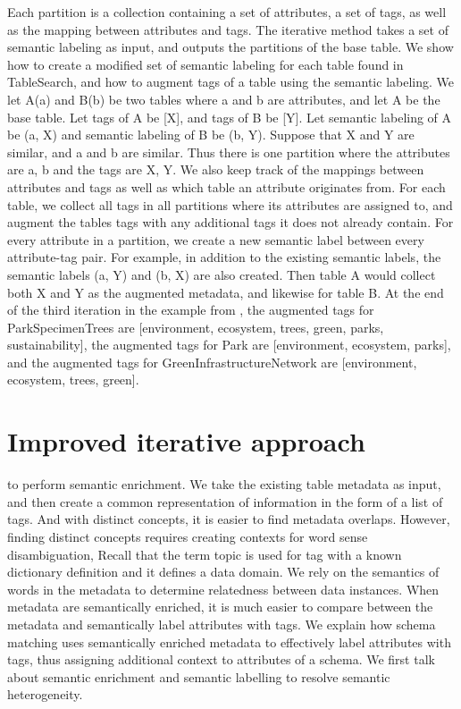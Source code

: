 Each partition is a collection containing a set of attributes, a set of tags, as well as the mapping between attributes and tags. The iterative method takes a set of semantic labeling as input, and outputs the partitions of the base table. We show how to create a modified set of semantic labeling for each table found in TableSearch, and how to augment tags of a table using the semantic labeling. We let A(a) and B(b) be two tables where a and b are attributes, and let A be the base table. Let tags of A be [X], and tags of B be [Y]. Let semantic labeling of A be {(a, X)} and semantic labeling of B be {(b, Y)}. Suppose that X and Y are similar, and a and b are similar. Thus there is one partition where the attributes are {a, b} and the tags are {X, Y}. We also keep track of the mappings between attributes and tags as well as which table an attribute originates from. For each table, we collect all tags in all partitions where its attributes are assigned to, and augment the tables tags with any additional tags it does not already contain. For every attribute in a partition, we create a new semantic label between every attribute-tag pair. For example, in addition to the existing semantic labels, the semantic labels (a, Y) and (b, X) are also created. Then table A would collect both X and Y as the augmented metadata, and likewise for table B.
At the end of the third iteration in the example from \label{ssec:IterativeMethodExample}, the augmented tags for ParkSpecimenTrees are [environment, ecosystem, trees, green, parks, sustainability], the augmented tags for Park are [environment, ecosystem, parks], and the augmented tags for GreenInfrastructureNetwork are [environment, ecosystem, trees, green].

\section{Improved iterative approach}
\label{sec:ImprovedIterativeApproach}

to perform semantic enrichment. We take the existing table metadata as input, and then create a common representation of information in the form of a list of tags.
And with distinct concepts, it is easier to find metadata overlaps.
However, finding distinct concepts requires creating contexts for word sense disambiguation,
Recall that the term topic is used for tag with a known dictionary definition and it defines a data domain.
We rely on the semantics of words in the metadata to determine relatedness between data instances.
When metadata are semantically enriched, it is much easier to compare between the metadata and semantically label attributes with tags.
We explain how schema matching uses semantically enriched metadata to effectively label attributes with tags, thus assigning additional context to attributes of a schema.
We first talk about semantic enrichment and semantic labelling to resolve semantic heterogeneity.

